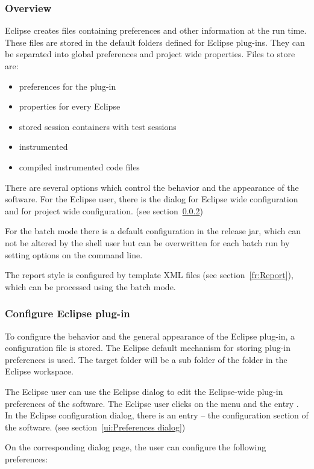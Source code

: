 \subsubsection{Overview} \label{fr:Configuration Overview}
Eclipse creates files containing preferences and other information at the run time. These files are stored in the default folders defined for Eclipse plug-ins. They can be separated into global preferences and project wide properties. Files to store are:
\begin{itemize}
  \item preferences for the plug-in
  \item properties for every Eclipse 
  \item stored session containers with test sessions
  \item instrumented 
  \item compiled instrumented code files
\end{itemize}
\par
There are several options which control the behavior and the appearance of the software. For the Eclipse user, there is the dialog  for Eclipse wide configuration and  for project wide configuration. (see section~\ref{fr:Configure Eclipse plug-in})
\par
For the batch mode there is a default configuration in the release jar, which can not be altered by the shell user but can be overwritten for each batch run by setting options on the command line.
\par
The report style is configured by template XML files (see section~\ref{fr:Report}), which can be processed using the batch mode.

\subsubsection{Configure Eclipse plug-in} \label{fr:Configure Eclipse plug-in}
To configure the behavior and the general appearance of the Eclipse plug-in, a configuration file is stored. The Eclipse default mechanism for storing plug-in preferences is used. The target folder will be a sub folder of the  folder in the Eclipse workspace.
\par
The Eclipse user can use the Eclipse dialog  to edit the Eclipse-wide plug-in preferences of the software. The Eclipse user clicks on the menu  and the entry . In the Eclipse configuration dialog, there is an entry \eclui{\gbt} -- the configuration section of the software. (see section~\ref{ui:Preferences dialog})
\par
On the corresponding dialog page, the user can configure the following preferences:


